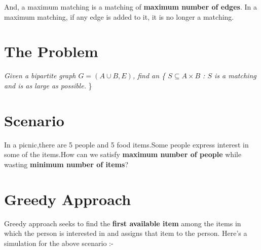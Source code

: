 \documentclass{article}
\begin{document}
And, a maximum matching is a matching of \textbf{maximum number of edges}. In a maximum matching, if any edge is added to it, it is no longer a matching.

\section{The Problem}
\textit{
Given a bipartite graph $G = (A \cup B, E)$, find an \{ $S \subseteq A \times B$ : $S$ is a matching and is as large as possible.} \} \cite{kleinberg2006algorithm}

\newpage

\section{Scenario}
In a picnic,there are 5 people and 5 food items.Some people express interest in some of the items.How can we satisfy \textbf{maximum number of people} while wasting \textbf{minimum number of items}?

\section{Greedy Approach}
Greedy approach seeks to find the \textbf{first available item} among the items in which the person is interested in and assigns that item to the person. Here's a simulation for the above scenario :- 
\end{document}
